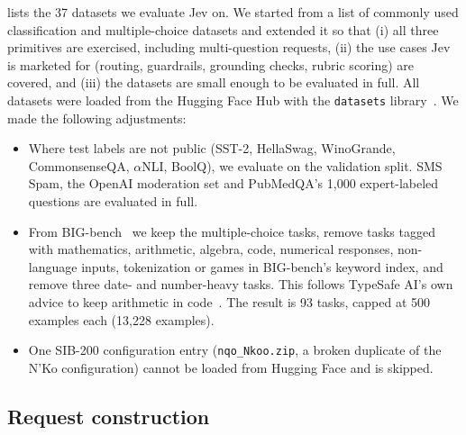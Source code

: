 \documentclass[table]{article}
\begin{document}
 lists the 37 datasets we evaluate Jev on. We started from a list of commonly used classification and multiple-choice datasets and extended it so that (i) all three primitives are exercised, including multi-question requests, (ii) the use cases Jev is marketed for (routing, guardrails, grounding checks, rubric scoring) are covered, and (iii) the datasets are small enough to be evaluated in full. All datasets were loaded from the Hugging Face Hub with the \texttt{datasets} library~\cite{lhoest-etal-2021-datasets}. We made the following adjustments:
\begin{itemize}[leftmargin=*,noitemsep]
    \item Where test labels are not public (SST-2, HellaSwag, WinoGrande, CommonsenseQA, $\alpha$NLI, BoolQ), we evaluate on the validation split. SMS Spam, the OpenAI moderation set and PubMedQA's 1{,}000 expert-labeled questions are evaluated in full.
    \item From BIG-bench~\cite{srivastava2023beyond} we keep the multiple-choice tasks, remove tasks tagged with mathematics, arithmetic, algebra, code, numerical responses, non-language inputs, tokenization or games in BIG-bench's keyword index, and remove three date- and number-heavy tasks. This follows TypeSafe AI's own advice to keep arithmetic in code~\cite{typesafe2026jev}. The result is 93 tasks, capped at 500 examples each (13{,}228 examples).
    \item One SIB-200 configuration entry (\texttt{nqo\_Nkoo.zip}, a broken duplicate of the N'Ko configuration) cannot be loaded from Hugging Face and is skipped.
\end{itemize}

\begin{table}[t]
\centering
\caption{Benchmark suite: 37 datasets in seven categories, the split we evaluate, the number of evaluated examples $n$, the number of languages for multilingual datasets, and the Jev primitive used (number of options or levels in parentheses; $\times k$: $k$ questions per request).}
\label{tab:suite}
\footnotesize
\setlength{\tabcolsep}{4pt}

\end{table}

\subsection{Request construction}
\end{document}
